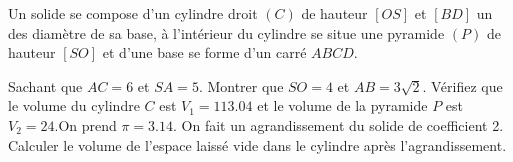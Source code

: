 \documentclass[a4paper,addpoints,12pt]{exam}
\begin{document}
\begin{exo}
Un solide se compose d'un cylindre droit $(C)$ de hauteur $[OS]$ et $[BD]$ un des diamètre de sa base, à l'intérieur du cylindre se situe une pyramide $(P)$ de hauteur $[SO]$ et d'une base se forme d'un carré $ABCD$.
\begin{questions}
\question Sachant que $AC=6$ et $SA=5$. Montrer que $SO=4$ et $AB=3\sqrt{2}$.
\question Vérifiez que le volume du cylindre $C$ est $V_{1}=113.04$ et le volume de la pyramide $P$ est $V_{2}=24$.On prend $\pi=3.14$.
\question On fait un agrandissement du solide de coefficient 2.
Calculer le volume de l'espace laissé vide dans le cylindre après l'agrandissement.
\end{questions}
\end{exo}
\end{document}
